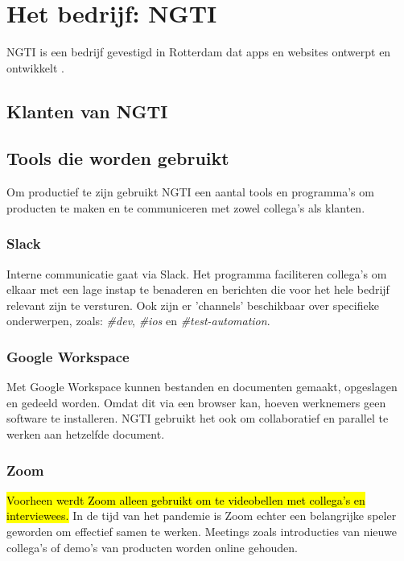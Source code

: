 
\section{Het bedrijf: NGTI}\label{sec:het-bedrijf-ngti}
NGTI is een bedrijf gevestigd in Rotterdam dat apps en websites ontwerpt en ontwikkelt \cite{ngti-services}. 

\subsection{Klanten van NGTI}\label{subsec:klanten-van-ngti}

\subsection{Tools die worden gebruikt}\label{subsec:tools-die-gebruikt-worden}
Om productief te zijn gebruikt NGTI een aantal tools en programma's om producten te maken en te communiceren met zowel collega's als klanten.

\subsubsection{Slack}\label{subsubsec:slack}
Interne communicatie gaat via Slack. Het programma faciliteren collega's om elkaar met een lage instap te benaderen en berichten die voor het hele bedrijf relevant zijn te versturen. Ook zijn er 'channels' beschikbaar over specifieke onderwerpen, zoals: \textit{\#dev}, \textit{\#ios} en \textit{\#test-automation}.

\subsubsection{Google Workspace}\label{subsubsec:google-workspace}
Met Google Workspace kunnen bestanden en documenten gemaakt, opgeslagen en gedeeld worden. Omdat dit via een browser kan, hoeven werknemers geen software te installeren. NGTI gebruikt het ook om collaboratief en parallel te werken aan hetzelfde document.

\subsubsection{Zoom}\label{subsubsec:zoom}
\hl{Voorheen werdt Zoom alleen gebruikt om te videobellen met collega's en interviewees.} In de tijd van het pandemie is Zoom echter een belangrijke speler geworden om effectief samen te werken. Meetings zoals introducties van nieuwe collega's of demo's van producten worden online gehouden.

